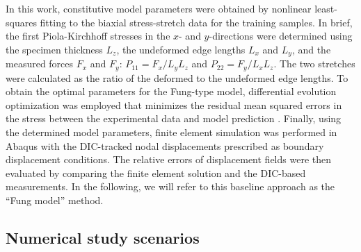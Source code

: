 \documentclass[twocolumn,10pt]{asme2ej}
\renewcommand{\~}{\tilde}
\renewcommand{\-}{\bar}
\newcommand{\8}{\infty}
\numberwithin{equation}{section}
\begin{document}
In this work, constitutive model parameters were obtained by nonlinear least-squares fitting to the biaxial stress-stretch data for the training samples. In brief, the first Piola-Kirchhoff stresses in the $x$- and $y$-directions were determined using the specimen thickness $L_z$, the undeformed edge lengths $L_x$ and $L_y$, and the measured forces $F_x$ and $F_y$: $P_{11}=F_x/L_yL_z$ and $P_{22}=F_y/L_xL_z$. The two stretches were calculated as the ratio of the deformed to the undeformed edge lengths. To obtain the optimal parameters for the Fung-type model, differential evolution optimization was employed that minimizes the residual mean squared errors in the stress between the experimental data and model prediction \cite{price2006differential}. Finally, using the determined model parameters, finite element simulation was performed in Abaqus \cite{abaqus2011abaqus} with the DIC-tracked nodal displacements prescribed as boundary displacement conditions. The relative errors of displacement fields were then evaluated by comparing the finite element solution and the DIC-based measurements. In the following, we will refer to this baseline approach as the ``Fung model'' method.




\subsection{Numerical study scenarios}\label{sec:studies}
\end{document}
